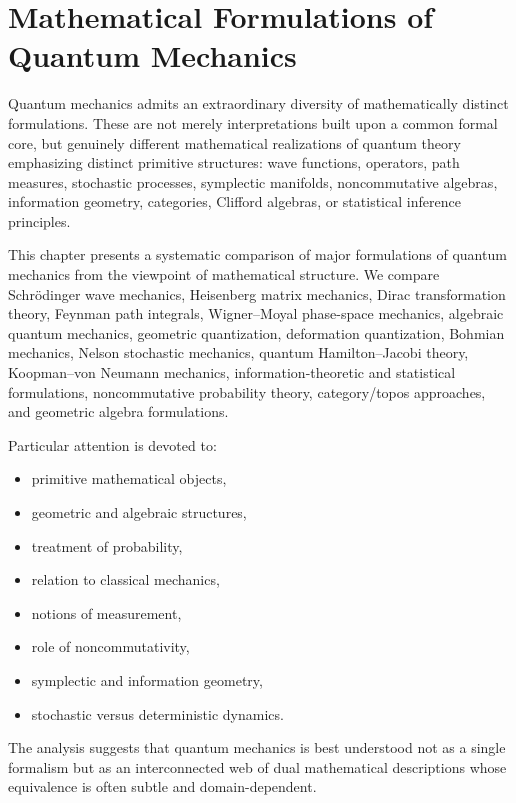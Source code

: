 \chapter{Mathematical Formulations of Quantum Mechanics}
\label{qmf}
Quantum mechanics admits an extraordinary diversity of mathematically
distinct formulations. These are not merely interpretations built upon a
common formal core, but genuinely different mathematical realizations of
quantum theory emphasizing distinct primitive structures: wave functions,
operators, path measures, stochastic processes, symplectic manifolds,
noncommutative algebras, information geometry, categories, Clifford 
algebras, or statistical inference principles. 

This chapter presents a systematic comparison of major formulations of
quantum mechanics from the viewpoint of mathematical structure. We compare
Schr\"odinger wave mechanics, Heisenberg matrix mechanics, Dirac 
transformation theory, Feynman path integrals, Wigner--Moyal phase-space
mechanics, algebraic quantum mechanics, geometric quantization,
deformation quantization, Bohmian mechanics, Nelson stochastic mechanics,
quantum Hamilton--Jacobi theory, Koopman--von Neumann mechanics,
information-theoretic and statistical formulations, noncommutative
probability theory, category/topos approaches, and geometric algebra
formulations.

Particular attention is devoted to:
\begin{itemize}
\item primitive mathematical objects,
\item geometric and algebraic structures,
\item treatment of probability,
\item relation to classical mechanics,
\item notions of measurement,
\item role of noncommutativity,
\item symplectic and information geometry,
\item stochastic versus deterministic dynamics.
\end{itemize}
The analysis suggests that quantum mechanics is best understood not as a
single formalism but as an interconnected web of dual mathematical
descriptions whose equivalence is often subtle and domain-dependent.

